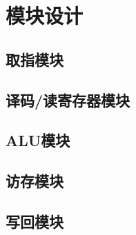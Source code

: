 \section{模块设计}
\subsection{取指模块}
\subsection{译码/读寄存器模块}
\subsection{ALU模块}
\subsection{访存模块}
\subsection{写回模块}